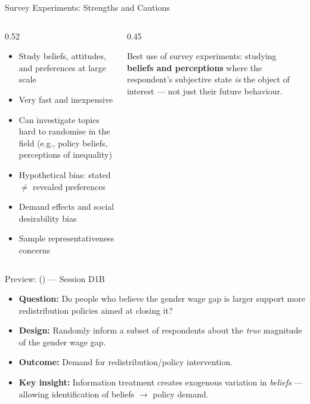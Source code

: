 \documentclass[aspectratio=169, 11pt]{beamer}
\begin{document}
\begin{frame}[t]{Survey Experiments: Strengths and Cautions}
\begin{columns}[T]
\begin{column}{0.52\textwidth}
\begin{itemize}
  \setlength\itemsep{0.4em}
  \item[\textcolor{okabegreen}{\textbf{+}}] Study beliefs, attitudes, and preferences at large scale
  \item[\textcolor{okabegreen}{\textbf{+}}] Very fast and inexpensive
  \item[\textcolor{okabegreen}{\textbf{+}}] Can investigate topics hard to randomise in the field
        (e.g., policy beliefs, perceptions of inequality)
  \item[\textcolor{okabevermillion}{\textbf{--}}] Hypothetical bias: stated $\neq$ revealed preferences
  \item[\textcolor{okabevermillion}{\textbf{--}}] Demand effects and social desirability bias
  \item[\textcolor{okabevermillion}{\textbf{--}}] Sample representativeness concerns
\end{itemize}
\end{column}
\begin{column}{0.45\textwidth}
  \begin{intuitionbox}
    \small
    Best use of survey experiments: studying \textbf{beliefs and perceptions}
    where the respondent's subjective state \emph{is} the object of interest —
    not just their future behaviour.
  \end{intuitionbox}
\end{column}
\end{columns}
\end{frame}

\begin{frame}[t]{Preview: \citeauthor{Settele2022_gender} (\citeyear{Settele2022_gender}) — Session D1B}
\begin{examplebox}
  \small
  \begin{itemize}
    \item \textbf{Question:} Do people who believe the gender wage gap is larger
          support more redistribution policies aimed at closing it?
    \item \textbf{Design:} Randomly inform a subset of respondents about the
          \emph{true} magnitude of the gender wage gap.
    \item \textbf{Outcome:} Demand for redistribution/policy intervention.
    \item \textbf{Key insight:} Information treatment creates exogenous variation
          in \emph{beliefs} — allowing identification of beliefs $\to$ policy demand.
  \end{itemize}
\end{examplebox}
\vspace{0.3em}
\end{frame}
\end{document}
